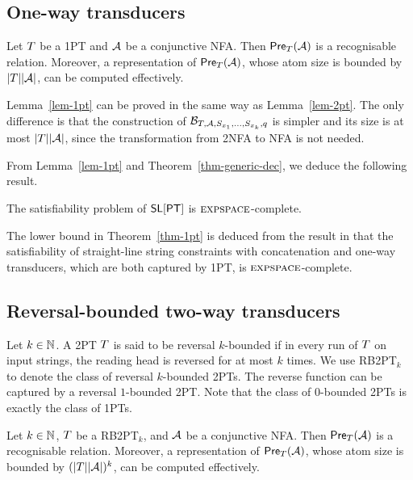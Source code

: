 


\subsection{One-way transducers}


\begin{lemma}\label{lem-1pt}
Let $T$ be a 1PT and $\mathcal{A}$ be a conjunctive NFA. Then $\textsf{Pre}_{T}(\mathcal{A})$ is a recognisable relation. Moreover, a representation of $\textsf{Pre}_{T}(\mathcal{A})$, whose atom size is bounded by $|T||\mathcal{A}|$, can be computed effectively.
\end{lemma}

Lemma~\ref{lem-1pt} can be proved in the same way as Lemma~\ref{lem-2pt}. The only difference is that the construction of $\mathcal{B}_{T, \mathcal{A}, S_{x_1}, \ldots, S_{x_k}, q}$ is simpler and its size is at most $|T| |\mathcal{A}|$, since the transformation from  2NFA to NFA is not needed.

From Lemma~\ref{lem-1pt} and Theorem~\ref{thm-generic-dec}, we deduce the following result.
%
\begin{theorem} \label{thm-1pt}
The satisfiability problem of $\textsf{SL}[\textsf{PT}]$ is $\textsc{expspace}$-complete. 
\end{theorem}

The lower bound in Theorem~\ref{thm-1pt} is deduced from the result in \cite{LB16} that the satisfiability of straight-line string constraints with concatenation and one-way transducers, which are both captured by 1PT, is $\textsc{expspace}$-complete.

\subsection{Reversal-bounded two-way transducers}

Let $k \in \mathbb{N}$. A 2PT $T$ is said  to be reversal $k$-bounded if in every run of $T$ on input strings, the reading head is reversed for at most $k$ times. We use  RB2PT$_k$ to denote the class of reversal $k$-bounded 2PTs. The reverse function can be captured by a reversal $1$-bounded 2PT.
Note that the class of $0$-bounded 2PTs is exactly the class of 1PTs.

\begin{lemma}\label{lem-rb-2pt}
Let $k \in \mathbb{N}$, $T$ be a RB2PT$_k$, and $\mathcal{A}$ be a conjunctive NFA. Then $\textsf{Pre}_{T}(\mathcal{A})$ is a recognisable relation. Moreover, a representation of $\textsf{Pre}_{T}(\mathcal{A})$, whose atom size is bounded by $(|T||\mathcal{A}|)^k$, can be computed effectively.
\end{lemma}

